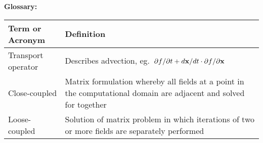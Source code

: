 \begin{table}[h]
\textbf{\textsf{Glossary:}}
\begin{center}
\begin{tabular}{|p{4.0cm}|p{12.0cm}|}
\hline
\textbf{\textsf{Term or Acronym}}
& \textbf{\textsf{Definition}} \\
\hline
 Transport operator & Describes advection, eg.\ $\partial f/\partial t +
d {\bf x}/dt \cdot \partial f/\partial {\bf x}$ \\
\hline
Close-coupled & Matrix formulation whereby all fields at a
   point in the computational domain are adjacent and solved for together \\
\hline
Loose-coupled & Solution of matrix problem in which iterations of two or
more fields are separately performed \\
\hline
\end{tabular}
\end{center}
\end{table}



